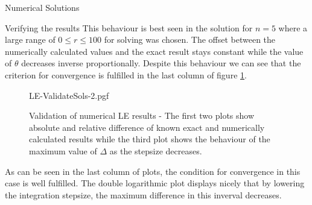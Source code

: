 \begin{section}{Numerical Solutions}
\begin{subsection}{Verifying the results}
This behaviour is best seen in the solution for $n=5$ where a large range of $0\leq r\leq100$ for solving was chosen. 
The offset between the numerically calculated values and the exact result stays constant while the value of $\theta$ decreases inverse proportionally.
Despite this behaviour we can see that the criterion for convergence is fulfilled in the last column of figure \ref{4-NumSol-Plt-ValidateLEResults}.%
\begin{figure}[H]
	\centering
	{LE-ValidateSols-2.pgf}
	\caption[Validation of numerical LE results]{Validation of numerical \ac{LE} results - The first two plots show absolute and relative difference of known exact and numerically calculated results while the third plot shows the behaviour of the maximum value of $\Delta$ as the stepsize decreases.}
	\label{4-NumSol-Plt-ValidateLEResults}
\end{figure}\noindent
As can be seen in the last column of plots, the condition for convergence in this case is well fulfilled. 
The double logarithmic plot displays nicely that by lowering the integration stepsize, the maximum difference in this inverval decreases.

\end{subsection}
\end{section}
